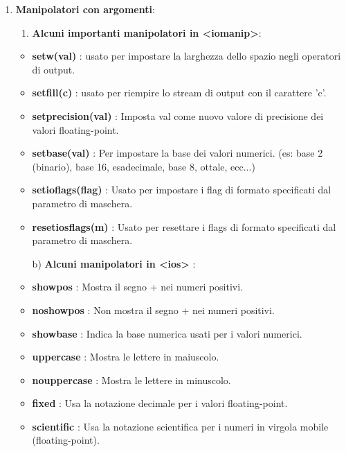 \begin{enumerate}
	\item \textsf{\small \textbf{Manipolatori con argomenti}: }
	\begin{enumerate}
		\item \textsf{\small \textbf{Alcuni importanti manipolatori in <iomanip>}: }
	\end{enumerate}
		\begin{itemize}
			\item \textsf{\small \textbf{setw(val)} : usato per impostare la larghezza dello spazio negli operatori di output.}
			\item \textsf{\small \textbf{setfill(c)} : usato per riempire lo stream di output con il carattere 'c'.}
			\item \textsf{\small \textbf{setprecision(val)} : Imposta val come nuovo valore di precisione dei valori floating-point.}
			\item \textsf{\small \textbf{setbase(val)} : Per impostare la base dei valori numerici. (es: base 2 (binario), base 16, esadecimale, base 8, ottale, ecc...)}
			\item \textsf{\small \textbf{setioflags(flag)} : Usato per impostare i flag di formato specificati dal parametro di maschera.}
			\item \textsf{\small \textbf{resetiosflags(m)} : Usato per resettare i flags di formato specificati dal parametro di maschera.}
		\end{itemize}
	\begin{enumerate}
		\item[b)] \textsf{\small \textbf{Alcuni manipolatori in <ios>} : }
	\end{enumerate}
		\begin{itemize}
			\item \textsf{\small \textbf{showpos} : Mostra il segno + nei numeri positivi.}
			\item \textsf{\small \textbf{noshowpos} : Non mostra il segno + nei numeri positivi.}
			\item \textsf{\small \textbf{showbase} : Indica la base numerica usati per i valori numerici.}
			\item \textsf{\small \textbf{uppercase} : Mostra le lettere in maiuscolo.}
			\item \textsf{\small \textbf{nouppercase} : Mostra le lettere in minuscolo.}
			\item \textsf{\small \textbf{fixed} : Usa la notazione decimale per i valori floating-point.}
			\item \textsf{\small \textbf{scientific} : Usa la notazione scientifica per i numeri in virgola mobile (floating-point).}

\end{itemize}
\end{enumerate}
